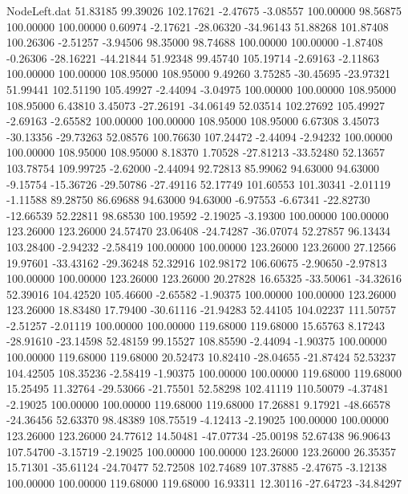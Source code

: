 \begin{filecontents}{NodeLeft.dat}
  51.83185   99.39026  102.17621    -2.47675   -3.08557  100.00000   98.56875  100.00000  100.00000    0.60974   -2.17621  -28.06320  -34.96143
  51.88268  101.87408  100.26306    -2.51257   -3.94506   98.35000   98.74688  100.00000  100.00000   -1.87408   -0.26306  -28.16221  -44.21844
  51.92348   99.45740  105.19714    -2.69163   -2.11863  100.00000  100.00000  108.95000  108.95000    9.49260    3.75285  -30.45695  -23.97321
  51.99441  102.51190  105.49927    -2.44094   -3.04975  100.00000  100.00000  108.95000  108.95000    6.43810    3.45073  -27.26191  -34.06149
  52.03514  102.27692  105.49927    -2.69163   -2.65582  100.00000  100.00000  108.95000  108.95000    6.67308    3.45073  -30.13356  -29.73263
  52.08576  100.76630  107.24472    -2.44094   -2.94232  100.00000  100.00000  108.95000  108.95000    8.18370    1.70528  -27.81213  -33.52480
  52.13657  103.78754  109.99725    -2.62000   -2.44094   92.72813   85.99062   94.63000   94.63000   -9.15754  -15.36726  -29.50786  -27.49116
  52.17749  101.60553  101.30341    -2.01119   -1.11588   89.28750   86.69688   94.63000   94.63000   -6.97553   -6.67341  -22.82730  -12.66539
  52.22811   98.68530  100.19592    -2.19025   -3.19300  100.00000  100.00000  123.26000  123.26000   24.57470   23.06408  -24.74287  -36.07074
  52.27857   96.13434  103.28400    -2.94232   -2.58419  100.00000  100.00000  123.26000  123.26000   27.12566   19.97601  -33.43162  -29.36248
  52.32916  102.98172  106.60675    -2.90650   -2.97813  100.00000  100.00000  123.26000  123.26000   20.27828   16.65325  -33.50061  -34.32616
  52.39016  104.42520  105.46600    -2.65582   -1.90375  100.00000  100.00000  123.26000  123.26000   18.83480   17.79400  -30.61116  -21.94283
  52.44105  104.02237  111.50757    -2.51257   -2.01119  100.00000  100.00000  119.68000  119.68000   15.65763    8.17243  -28.91610  -23.14598
  52.48159   99.15527  108.85590    -2.44094   -1.90375  100.00000  100.00000  119.68000  119.68000   20.52473   10.82410  -28.04655  -21.87424
  52.53237  104.42505  108.35236    -2.58419   -1.90375  100.00000  100.00000  119.68000  119.68000   15.25495   11.32764  -29.53066  -21.75501
  52.58298  102.41119  110.50079    -4.37481   -2.19025  100.00000  100.00000  119.68000  119.68000   17.26881    9.17921  -48.66578  -24.36456
  52.63370   98.48389  108.75519    -4.12413   -2.19025  100.00000  100.00000  123.26000  123.26000   24.77612   14.50481  -47.07734  -25.00198
  52.67438   96.90643  107.54700    -3.15719   -2.19025  100.00000  100.00000  123.26000  123.26000   26.35357   15.71301  -35.61124  -24.70477
  52.72508  102.74689  107.37885    -2.47675   -3.12138  100.00000  100.00000  119.68000  119.68000   16.93311   12.30116  -27.64723  -34.84297

\end{filecontents}
